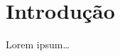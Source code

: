 	

	\tableofcontents 
	\newpage \listoffigures
	\newpage \listoftables
	\textual


%
%

%
%
	
	\chapter{Introdução}

	Lorem ipsum\dots	
    
%
%

	\postextual
	
	
	
	
	\renewcommand{\glossaryname}{Glossário}
	\renewcommand*{\glsseeformat}[3][\seename]{\textit{#1}
		\glsseelist{#2}}
	
